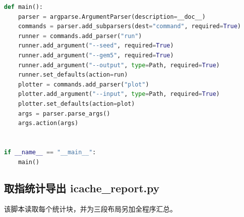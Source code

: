 \documentclass[12pt,a4paper,fontset=mac]{ctexart}
\begin{document}
\begin{lstlisting}[language=Python]
def main():
    parser = argparse.ArgumentParser(description=__doc__)
    commands = parser.add_subparsers(dest="command", required=True)
    runner = commands.add_parser("run")
    runner.add_argument("--seed", required=True)
    runner.add_argument("--gem5", required=True)
    runner.add_argument("--output", type=Path, required=True)
    runner.set_defaults(action=run)
    plotter = commands.add_parser("plot")
    plotter.add_argument("--input", type=Path, required=True)
    plotter.set_defaults(action=plot)
    args = parser.parse_args()
    args.action(args)


if __name__ == "__main__":
    main()
\end{lstlisting}

\subsection{取指统计导出 icache\_report.py}
该脚本读取每个统计块，并为三段布局另加全程序汇总。
\end{document}
